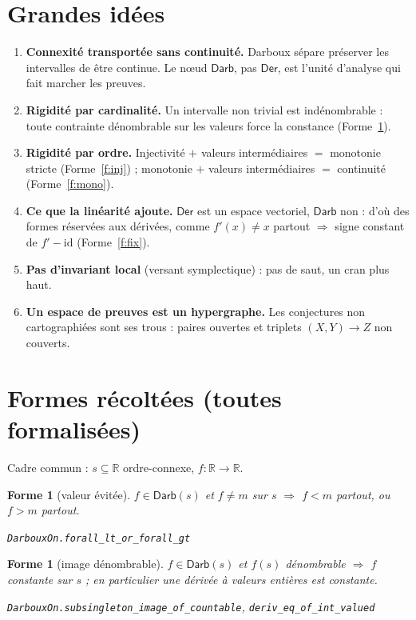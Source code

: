 \documentclass[11pt,a4paper]{article}
\theoremstyle{plain}
\newtheorem{forme}[theoreme]{Forme}
\theoremstyle{definition}
\theoremstyle{remark}
\newcommand{\Darb}{\mathsf{Darb}}
\newcommand{\Der}{\mathsf{Der}}
\newcommand{\R}{\mathbb{R}}
\begin{document}
\section{Grandes idées}

\begin{enumerate}\itemsep2pt
\item \textbf{Connexité transportée sans continuité.} Darboux sépare \og{}préserver les
intervalles\fg{} de \og{}être continue\fg{}. Le n\oe ud $\Darb$, pas $\Der$, est l'unité d'analyse
qui fait marcher les preuves.
\item \textbf{Rigidité par cardinalité.} Un intervalle non trivial est indénombrable :
toute contrainte dénombrable sur les valeurs force la constance (Forme~\ref{f:count}).
\item \textbf{Rigidité par ordre.} Injectivité $+$ valeurs intermédiaires $=$ monotonie
stricte (Forme~\ref{f:inj}) ; monotonie $+$ valeurs intermédiaires $=$ continuité
(Forme~\ref{f:mono}).
\item \textbf{Ce que la linéarité ajoute.} $\Der$ est un espace vectoriel, $\Darb$ non :
d'où des formes réservées aux dérivées, comme $f'(x)\neq x$ partout $\Rightarrow$ signe
constant de $f'-\mathrm{id}$ (Forme~\ref{f:fix}).
\item \textbf{Pas d'invariant local} (versant symplectique) : \og{}pas de saut\fg{}, un cran plus
haut.
\item \textbf{Un espace de preuves est un hypergraphe.} Les conjectures non cartographiées
sont ses trous : paires ouvertes et triplets $(X,Y)\to Z$ non couverts.
\end{enumerate}

\section{Formes récoltées (toutes formalisées)}

Cadre commun : $s\subseteq\R$ ordre-connexe, $f:\R\to\R$.

\begin{forme}[valeur évitée]\label{f:sign}
$f\in\Darb(s)$ et $f\neq m$ sur $s$ $\Rightarrow$ $f<m$ partout, ou $f>m$ partout.
\par\smallskip\hfill\small\texttt{DarbouxOn.forall\_lt\_or\_forall\_gt}
\end{forme}

\begin{forme}[image dénombrable]\label{f:count}
$f\in\Darb(s)$ et $f(s)$ dénombrable $\Rightarrow$ $f$ constante sur $s$ ; en particulier
une dérivée à valeurs entières est constante.
\par\smallskip\hfill\small\texttt{DarbouxOn.subsingleton\_image\_of\_countable}, \texttt{deriv\_eq\_of\_int\_valued}
\end{forme}
\end{document}
